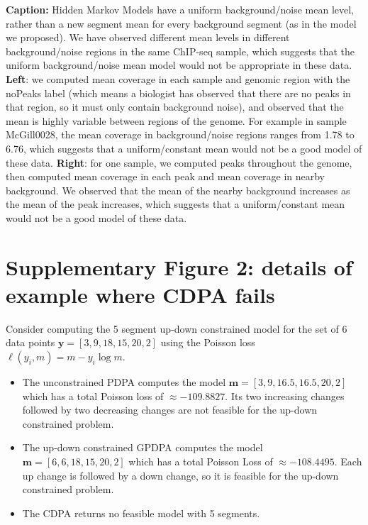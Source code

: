 \documentclass{article}
\begin{document}
\textbf{Caption:} Hidden Markov Models have a uniform background/noise mean
level, rather than a new segment mean for every background segment (as
in the model we proposed). We have observed different mean levels in
different background/noise regions in the same ChIP-seq sample, which
suggests that the uniform background/noise mean model would not be
appropriate in these data.  \textbf{Left}: we computed mean coverage
in each sample and genomic region with the noPeaks label (which means
a biologist has observed that there are no peaks in that region, so it
must only contain background noise), and observed that the mean is
highly variable between regions of the genome. For example in sample
McGill0028, the mean coverage in background/noise regions ranges from
1.78 to 6.76, which suggests that a uniform/constant mean would not be
a good model of these data. \textbf{Right}: for one sample, we
computed peaks throughout the genome, then computed mean coverage in
each peak and mean coverage in nearby background. We observed that the
mean of the nearby background increases as the mean of the peak
increases, which suggests that a uniform/constant mean would not be a
good model of these data.
\newpage
\section*{Supplementary Figure 2: details of example where CDPA fails}

Consider computing the 5 segment up-down constrained model for the set
of 6 data points $\mathbf y = [3, 9, 18, 15, 20, 2]$ using the Poisson loss
$\ell(y_i, m)=m-y_i\log m$. 
\begin{itemize}
\item The unconstrained PDPA computes the model $\mathbf m = [3, 9, 16.5, 16.5, 20,
  2]$ which has a total Poisson loss of $\approx -109.8827$. Its two increasing
  changes followed by two decreasing changes are not feasible for the
  up-down constrained problem.
\item The up-down constrained GPDPA computes the model $\mathbf m = [6, 6, 18, 15,
  20, 2]$ which has a total Poisson Loss of $\approx -108.4495$. Each
  up change is followed by a down change, so it is feasible for the
  up-down constrained problem.
\item The CDPA returns no feasible model with 5 segments.
\end{itemize}
\end{document}
